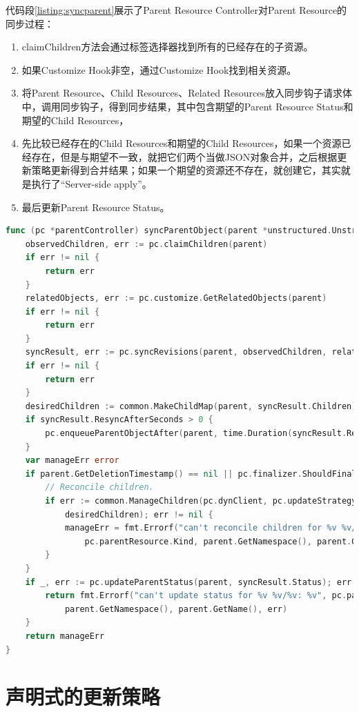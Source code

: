 \documentclass[macfonts,master]{njuthesis}
\begin{document}
代码段\ref{listing:syncparent}展示了Parent Resource Controller对Parent Resource的同步过程：
\begin{enumerate}
	\item claimChildren方法会通过标签选择器找到所有的已经存在的子资源。
	\item 如果Customize Hook非空，通过Customize Hook找到相关资源。
	\item 将Parent Resource、Child Resources、Related Resources放入同步钩子请求体中，调用同步钩子，得到同步结果，其中包含期望的Parent Resource Status和期望的Child Resources，
	\item 先比较已经存在的Child Resources和期望的Child Resources，如果一个资源已经存在，但是与期望不一致，就把它们两个当做JSON对象合并，之后根据更新策略更新得到合并结果；如果一个期望的资源还不存在，就创建它，其实就是执行了``Server-side apply''。
	\item 最后更新Parent Resource Status。
\end{enumerate}

\begin{lstlisting}[language=Go,caption=同步父资源,label=listing:syncparent]
func (pc *parentController) syncParentObject(parent *unstructured.Unstructured) error {
	observedChildren, err := pc.claimChildren(parent)
	if err != nil {
		return err
	}
	relatedObjects, err := pc.customize.GetRelatedObjects(parent)
	if err != nil {
		return err
	}
	syncResult, err := pc.syncRevisions(parent, observedChildren, relatedObjects)
	if err != nil {
		return err
	}
	desiredChildren := common.MakeChildMap(parent, syncResult.Children)
	if syncResult.ResyncAfterSeconds > 0 {
		pc.enqueueParentObjectAfter(parent, time.Duration(syncResult.ResyncAfterSeconds*float64(time.Second)))
	}
	var manageErr error
	if parent.GetDeletionTimestamp() == nil || pc.finalizer.ShouldFinalize(parent) {
		// Reconcile children.
		if err := common.ManageChildren(pc.dynClient, pc.updateStrategy, parent, observedChildren,
			desiredChildren); err != nil {
			manageErr = fmt.Errorf("can't reconcile children for %v %v/%v: %v",
				pc.parentResource.Kind, parent.GetNamespace(), parent.GetName(), err)
		}
	}
	if _, err := pc.updateParentStatus(parent, syncResult.Status); err != nil {
		return fmt.Errorf("can't update status for %v %v/%v: %v", pc.parentResource.Kind,
			parent.GetNamespace(), parent.GetName(), err)
	}
	return manageErr
}
\end{lstlisting}


\section{声明式的更新策略}
\end{document}
